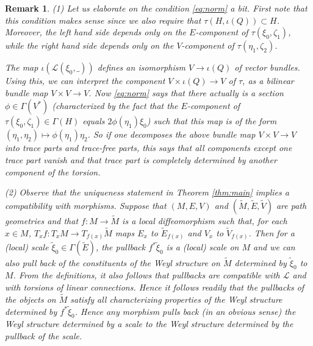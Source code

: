 \documentclass[11pt]{amsart}
\newtheorem{remark}[proposition]{Remark}
\numberwithin{proposition}{section}
\numberwithin{equation}{section}
\begin{document}
\begin{remark}\label{rem:norm}
(1) Let us elaborate on the condition \eqref{eq:norm} a bit. First note that this condition makes sense since we also require that $\tau(H,\iota(Q))\subset H$. Moreover, the left hand side depends only on the $E$-component of $\tau(\xi_0,\zeta_1)$, while the right hand side depends only on the $V$-component of $\tau(\eta_1,\zeta_2)$. 

The map $\iota(\mathcal L(\xi_0,\_))$ defines an isomorphism $V\to\iota(Q)$ of vector bundles. Using this, we can interpret the component $V\times \iota(Q)\to V$ of $\tau$, as a bilinear bundle map $V\times V\to V$. Now \eqref{eq:norm} says that there actually is a section $\phi\in\Gamma(V^*)$  (characterized by the fact that the $E$-component of $\tau(\xi_0,\zeta_1)\in\Gamma (H)$ equals $2\phi(\eta_1)\xi_0$) such that this map is of the form $(\eta_1,\eta_2)\mapsto\phi(\eta_1)\eta_2$. So if one decomposes the above bundle map $V\times V\to V$ into trace parts and trace-free parts, this says that all components except one trace part vanish and that trace part is completely determined by another component of the torsion. 

(2) Observe that the uniqueness statement in Theorem \ref{thm:main} implies a compatibility with morphisms. Suppose that $(M,E,V)$ and $(\tilde M,\tilde E,\tilde V)$ are path geometries and that $f:M\to\tilde M$ is a local diffeomorphism such that, for each $x\in M$, $T_xf:T_xM\to T_{f(x)}\tilde M$ maps $E_x$ to $\tilde E_{f(x)}$ and $V_x$ to $\tilde V_{f(x)}$. Then for a (local) scale $\tilde\xi_0\in\Gamma(\tilde E)$, the pullback $f^*\tilde\xi_0$ is a (local) scale on $M$ and we can also pull back of the constituents of the Weyl structure on $\tilde M$ determined by $\tilde\xi_0$ to $M$. From the definitions, it also follows that pullbacks are compatible with $\mathcal L$ and with torsions of linear connections. Hence it follows readily that the pullbacks of the objects on $\tilde M$ satisfy all characterizing properties of the Weyl structure determined by $f^*\tilde\xi_0$. Hence any morphism pulls back (in an obvious sense) the Weyl structure determined by a scale to the Weyl structure determined by the pullback of the scale.     


\end{remark}
\end{document}
